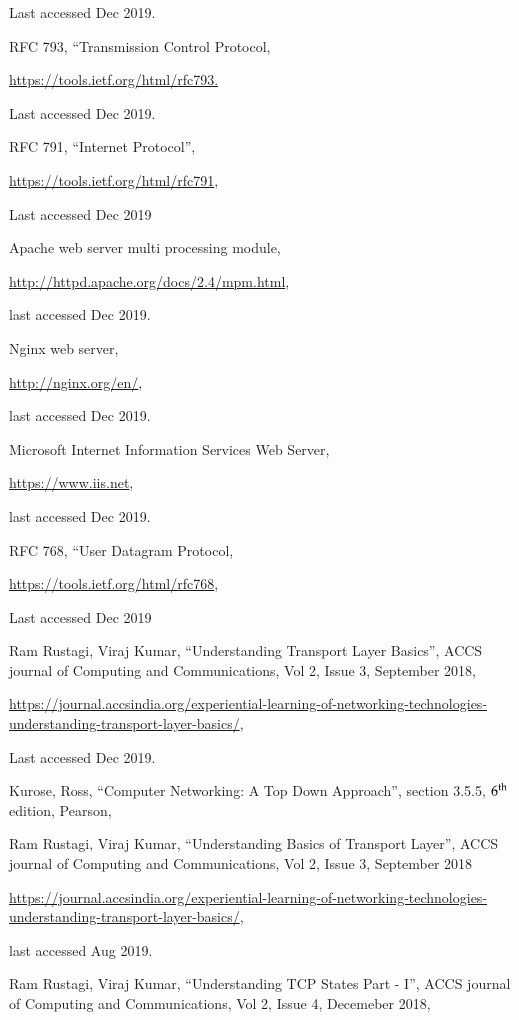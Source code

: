 \begin{multicols}{2}
\begin{thebibliography}{99}
Last accessed Dec 2019.

 RFC 793, “Transmission Control Protocol,

\url{https://tools.ietf.org/html/rfc793.}

Last accessed Dec 2019.

 RFC 791, “Internet Protocol”,

\url{https://tools.ietf.org/html/rfc791},

Last accessed Dec 2019

 Apache web server multi processing module,

\url{http://httpd.apache.org/docs/2.4/mpm.html},

last accessed Dec 2019.

 Nginx web server,

\url{http://nginx.org/en/},

last accessed Dec 2019.

 Microsoft Internet Information Services Web Server,

\url{https://www.iis.net},

last accessed Dec 2019.

 RFC 768, “User Datagram Protocol,

\url{https://tools.ietf.org/html/rfc768},

Last accessed Dec 2019

  Ram Rustagi, Viraj Kumar, “Understanding Transport Layer Basics”, ACCS journal of Computing and Communications, Vol 2, Issue 3, September 2018,

\url{https://journal.accsindia.org/experiential-learning-of-networking-technologies-understanding-transport-layer-basics/},

Last accessed Dec 2019.

 Kurose, Ross, “Computer Networking: A Top Down Approach”, section 3.5.5, $6^{\rm th}$ edition, Pearson,

 Ram Rustagi, Viraj Kumar, “Understanding Basics of Transport Layer”, ACCS journal of Computing and Communications, Vol 2, Issue 3, September 2018

 \url{https://journal.accsindia.org/experiential-learning-of-networking-technologies-understanding-transport-layer-basics/},
 
 last accessed Aug 2019.

 Ram Rustagi, Viraj Kumar, “Understanding TCP States Part - I”, ACCS journal of Computing and Communications, Vol 2, Issue 4, Decemeber 2018,


\end{thebibliography}
\end{multicols}
